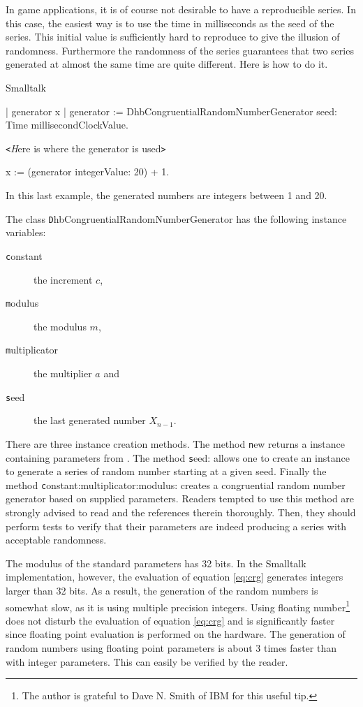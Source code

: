 In game applications, it is of course not desirable to have a
reproducible series. In this case, the easiest way is to use the
time in milliseconds as the seed of the series. This initial value
is sufficiently hard to reproduce to give the illusion of
randomness. Furthermore the randomness of the series guarantees
that two series generated at almost the same time are quite
different. Here is how to do it.
\begin{displaycode}{Smalltalk}

 | generator x |
 generator := DhbCongruentialRandomNumberGenerator
                        seed: Time millisecondClockValue.

\hfil{\texttt <\textsl Here is where the generator is used\texttt
>}\hfil

 x := (generator integerValue: 20) + 1.
\end{displaycode}

In this last example, the generated numbers are integers between 1
and 20.

 The class {\texttt
DhbCongruentialRandomNumberGenerator} has the following instance
variables:
\begin{description}
  \item[\texttt constant] the increment $c$,
  \item[\texttt modulus] the modulus $m$,
  \item[\texttt multiplicator] the multiplier $a$ and
  \item[\texttt seed] the last generated number $X_{n-1}$.
\end{description}
There are three instance creation methods. The method {\texttt new}
returns a  instance containing parameters from
\cite{Knuth2}. The method {\texttt seed:} allows one to create an
instance to generate a series of random number starting at a given
seed. Finally the method {\texttt constant:multiplicator:modulus:}
creates a congruential random number generator based on supplied
parameters. Readers tempted to use this method are strongly
advised to read \cite{Knuth2} and the references therein
thoroughly. Then, they should perform tests to verify that their
parameters are indeed producing a series with acceptable
randomness.

The modulus of the standard parameters has 32 bits. In the
Smalltalk implementation, however, the evaluation of equation
\ref{eq:crg} generates integers larger than 32 bits. As a result,
the generation of the random numbers is somewhat slow, as it is
using multiple precision integers. Using floating
number\footnote{The author is grateful to Dave N. Smith of IBM for
this useful tip.} does not disturb the evaluation of equation
\ref{eq:crg} and is significantly faster since floating point
evaluation is performed on the hardware. The generation of random
numbers using floating point parameters is about 3 times faster
than with integer parameters. This can easily be verified by the
reader.

